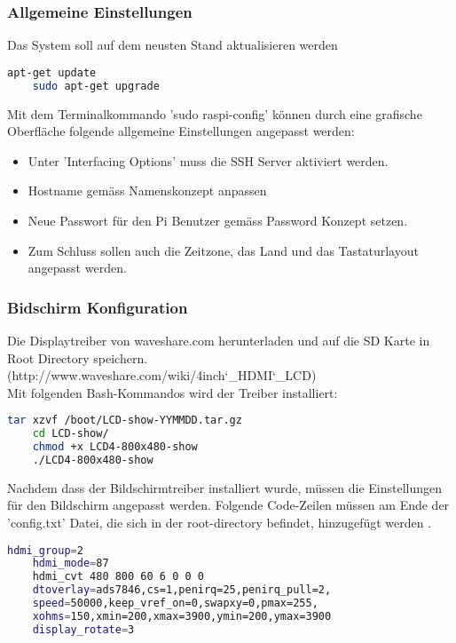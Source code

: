 \subsubsection{Allgemeine Einstellungen}
Das System soll auf dem neusten Stand aktualisieren werden
\begin{lstlisting}[backgroundcolor = \color{snippetcolor},
language = bash,
xleftmargin = 1cm,
framexleftmargin = 0.1em,
breaklines=true]
	apt-get update 
	sudo apt-get upgrade
\end{lstlisting}

Mit dem Terminalkommando ’sudo raspi-config’ können durch eine grafische Oberfläche folgende allgemeine Einstellungen angepasst werden:
\begin{itemize}
	\item Unter 'Interfacing Options' muss die SSH Server aktiviert werden.
	\item Hostname gemäss Namenskonzept anpassen
	\item Neue Passwort für den Pi Benutzer gemäss Password Konzept setzen.
	\item Zum Schluss sollen auch die Zeitzone, das Land und das Tastaturlayout angepasst werden.
\end{itemize}

\subsubsection{Bidschirm Konfiguration}
Die Displaytreiber von waveshare.com herunterladen und auf die SD Karte in Root Directory speichern. (http://www.waveshare.com/wiki/4inch\char`_HDMI\char`_LCD)\\
Mit folgenden Bash-Kommandos wird der Treiber installiert:
\begin{lstlisting}[backgroundcolor = \color{snippetcolor},
language = bash,
xleftmargin = 1cm,
framexleftmargin = 0.1em,
breaklines=true]
	tar xzvf /boot/LCD-show-YYMMDD.tar.gz 
	cd LCD-show/
	chmod +x LCD4-800x480-show
	./LCD4-800x480-show
\end{lstlisting}
Nachdem dass der Bildschirmtreiber installiert wurde, müssen die Einstellungen für den Bildschirm angepasst werden. Folgende Code-Zeilen müssen am Ende der ’config.txt’ Datei, die sich in der root-directory befindet, hinzugefügt werden \cite{displayConfig}.
\begin{lstlisting}[backgroundcolor = \color{snippetcolor},
language = bash,
xleftmargin = 1cm,
framexleftmargin = 0.1em,
breaklines=true]
	hdmi_group=2
	hdmi_mode=87
	hdmi_cvt 480 800 60 6 0 0 0
	dtoverlay=ads7846,cs=1,penirq=25,penirq_pull=2,
	speed=50000,keep_vref_on=0,swapxy=0,pmax=255,
	xohms=150,xmin=200,xmax=3900,ymin=200,ymax=3900
	display_rotate=3
\end{lstlisting}

